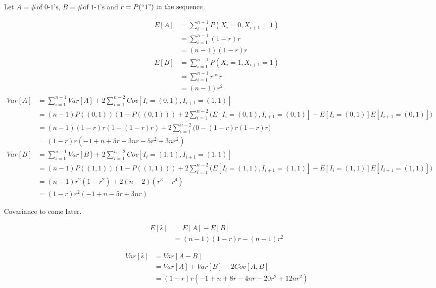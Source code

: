 \documentclass{article}
\begin{document}
    Let \(A = \text{\# of 0-1's}\), \(B = \text{\# of 1-1's}\) and \(r = P(``1")
    \text{ in the sequence}\).

    \begin{align*}
        E[A] 
            &= \sum_{i=1}^{n-1} P(X_i = 0, X_{i+1} = 1) \\
            &= \sum_{i=1}^{n-1} (1-r)r \\
            &= (n-1)(1-r)r
    \end{align*}
    \begin{align*}
        E[B]
            &= \sum_{i=1}^{n-1} P(X_i = 1, X_{i+1} = 1) \\
            &= \sum_{i=1}^{n-1} r*r \\
            &= (n-1)r^2
    \end{align*}
    \begin{align*}
        Var[A] 
            &= \sum_{i=1}^{n-1} Var[A] + 2\sum_{i=1}^{n-2} Cov[I_i = (0, 1),
               I_{i+1} = (1, 1)] \\
            &= (n-1)P((0, 1))(1-P((0, 1))) + 2\sum_{i=1}^{n-2}\bigg(E[I_i=(0, 
               1), I_{i+1} = (0, 1)] - E[I_i = (0, 1)]E[I_{i+1} = (0, 1)]\bigg)
               \\
            &= (n-1)(1-r)r(1-(1-r)r) + 2\sum_{i=1}^{n-2}\bigg(0 - (1-r)r(1-r)r
               \bigg) \\
            &= (1-r)r(-1+n+5r-3nr-5r^2+3nr^2)
    \end{align*}
    \begin{align*}
        Var[B] 
            &= \sum_{i=1}^{n-1} Var[B] + 2\sum_{i=1}^{n-2} Cov[I_i = (1, 1),
               I_{i+1} = (1, 1)] \\
            &= (n-1)P((1, 1))(1-P((1, 1))) + 2\sum_{i=1}^{n-2}\bigg(E[I_i=(1, 
               1), I_{i+1} = (1, 1)] - E[I_i = (1, 1)]E[I_{i+1} = (1, 1)]\bigg) 
               \\
            &= (n-1)r^2(1-r^2) + 2(n-2)(r^3-r^4) \\
            &= (1-r)r^2(-1+n-5r+3nr)
    \end{align*}

    Covariance to come later.

    \begin{align*}
        E[\hat{s}] 
            &= E[A] - E[B] \\
            &= (n-1)(1-r)r - (n-1)r^2
    \end{align*}

    \begin{align*}
        Var[\hat{s}] 
            &= Var[A-B] \\
            &= Var[A] + Var[B] - 2Cov[A, B] \\
            &= (1-r)r(-1+n+8r-4nr-20r^2+12nr^2)
    \end{align*}
\end{document}
